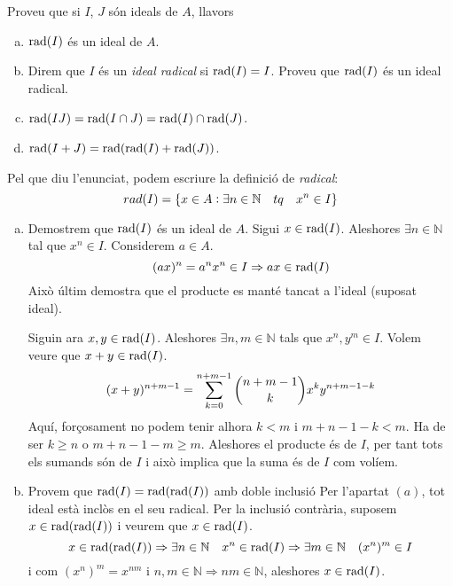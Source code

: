 \documentclass[../main.tex]{subfiles}
\begin{document}
\setcounter{exercici}{10}
\begin{exercici}\label{esal11}
 Proveu que si $I$, $J$ són ideals de $A$, llavors
\begin{enumerate}[(a)]
    \item $\operatorname{\mathrm{rad}}(I)$ és un ideal de $A$.
    \item Direm que $I$ és un \textit{ideal radical} si $\operatorname{\mathrm{rad}}(I)=I$. Proveu que $\operatorname{\mathrm{rad}}(I)$ és un ideal radical.
    \item $\operatorname{\mathrm{rad}}(IJ)=\operatorname{\mathrm{rad}}(I\cap J)=\operatorname{\mathrm{rad}}(I)\cap \operatorname{\mathrm{rad}}(J)$.
    \item $\operatorname{\mathrm{rad}}(I+J)=\operatorname{\mathrm{rad}}(\operatorname{\mathrm{rad}}(I)+\operatorname{\mathrm{rad}}(J))$.
\end{enumerate}
\end{exercici}
\begin{sol}
Pel que diu l'enunciat, podem escriure la definició de \textit{radical}:
\begin{equation}
    \notag
    rad(I)=\{x\in A: \exists n\in \mathbb{N}\quad tq \quad x^n\in I\}
\end{equation}

\begin{enumerate}[(a)]
    \item Demostrem que $\operatorname{\mathrm{rad}}(I)$ és un ideal de $A$. Sigui $x\in \operatorname{\mathrm{rad}}(I)$. Aleshores $\exists n \in \mathbb{N}$ tal que $x^n\in I$. Considerem $a\in A$. 
        \begin{equation}
            \notag
            (ax)^n=a^nx^n\in I \Rightarrow ax\in \operatorname{\mathrm{rad}}(I)
        \end{equation}
        Això últim demostra que el producte es manté tancat a l'ideal (suposat ideal).
        
        Siguin ara $x,y\in \operatorname{\mathrm{rad}}(I)$. Aleshores $\exists n,m\in \mathbb{N}$ tals que $x^n,y^m\in I$. Volem veure que $x+y\in \operatorname{\mathrm{rad}}(I)$.
        \begin{equation}
            \notag
            (x+y)^{n+m-1}=\displaystyle\sum_{k=0}^{n+m-1}\binom{n+m-1}{k}x^ky^{n+m-1-k}
        \end{equation}
        Aquí, forçosament no podem tenir alhora $k<m$ i $m+n-1-k<m$. Ha de ser $k \geq n$ o $m+n-1-m\geq m$. Aleshores el producte és de $I$, per tant tots els sumands són de $I$ i això implica que la suma és de $I$ com volíem.
    
    \item Provem que $\operatorname{\mathrm{rad}}(I)=\operatorname{\mathrm{rad}}(\operatorname{\mathrm{rad}}(I))$ amb doble inclusió
        Per l'apartat $(a)$, tot ideal està inclòs en el seu radical. Per la inclusió contrària, suposem $x\in \operatorname{\mathrm{rad}}(\operatorname{\mathrm{rad}}(I))$ i veurem que $x\in \operatorname{\mathrm{rad}}(I)$.
        \begin{equation}
            \notag
            x\in \operatorname{\mathrm{rad}}(\operatorname{\mathrm{rad}}(I)) \Rightarrow \exists n\in \mathbb{N} \quad x^n\in \operatorname{\mathrm{rad}}(I) \Rightarrow \exists m\in \mathbb{N} \quad (x^n)^m \in I
        \end{equation}
        i com $(x^n)^m=x^{nm}$ i $n,m\in \mathbb{N}\Rightarrow nm\in \mathbb{N}$, aleshores $x\in \operatorname{\mathrm{rad}}(I)$.
    

\end{enumerate}
\end{sol}
\end{document}
